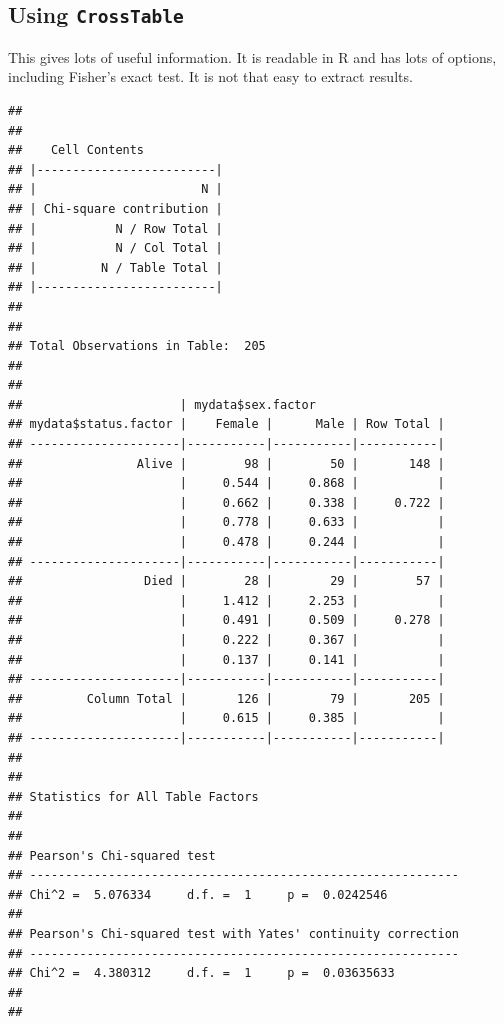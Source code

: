 \documentclass[]{book}
\makeatletter
\newenvironment{Shaded}{\begin{snugshade}}{\end{snugshade}}
\newcommand{\CommentTok}[1]{\textcolor[rgb]{0.56,0.35,0.01}{\textit{#1}}}
\newcommand{\DataTypeTok}[1]{\textcolor[rgb]{0.13,0.29,0.53}{#1}}
\newcommand{\KeywordTok}[1]{\textcolor[rgb]{0.13,0.29,0.53}{\textbf{#1}}}
\newcommand{\NormalTok}[1]{#1}
\newcommand{\OperatorTok}[1]{\textcolor[rgb]{0.81,0.36,0.00}{\textbf{#1}}}
\newcommand{\OtherTok}[1]{\textcolor[rgb]{0.56,0.35,0.01}{#1}}
\newenvironment{kframe}{%
\medskip{}
\setlength{\fboxsep}{.8em}
 \def\at@end@of@kframe{}%
 \ifinner\ifhmode%
  \def\at@end@of@kframe{\end{minipage}}%
  \begin{minipage}{\columnwidth}%
 \fi\fi%
 \def\FrameCommand##1{\hskip\@totalleftmargin \hskip-\fboxsep
 \colorbox{shadecolor}{##1}\hskip-\fboxsep
     \hskip-\linewidth \hskip-\@totalleftmargin \hskip\columnwidth}%
 \MakeFramed {\advance\hsize-\width
   \@totalleftmargin\z@ \linewidth\hsize
   \@setminipage}}%
 {\par\unskip\endMakeFramed%
 \at@end@of@kframe}
\renewenvironment{Shaded}{\begin{kframe}}{\end{kframe}}
\theoremstyle{definition}
\theoremstyle{definition}
\theoremstyle{definition}
\theoremstyle{remark}
\makeatother
\begin{document}
\hypertarget{using-crosstable}{%
\subsection{\texorpdfstring{Using
\texttt{CrossTable}}{Using CrossTable}}\label{using-crosstable}}

This gives lots of useful information. It is readable in R and has lots
of options, including Fisher's exact test. It is not that easy to
extract results. \newpage

\begin{Shaded}
\end{Shaded}

\begin{verbatim}
## 
##  
##    Cell Contents
## |-------------------------|
## |                       N |
## | Chi-square contribution |
## |           N / Row Total |
## |           N / Col Total |
## |         N / Table Total |
## |-------------------------|
## 
##  
## Total Observations in Table:  205 
## 
##  
##                      | mydata$sex.factor 
## mydata$status.factor |    Female |      Male | Row Total | 
## ---------------------|-----------|-----------|-----------|
##                Alive |        98 |        50 |       148 | 
##                      |     0.544 |     0.868 |           | 
##                      |     0.662 |     0.338 |     0.722 | 
##                      |     0.778 |     0.633 |           | 
##                      |     0.478 |     0.244 |           | 
## ---------------------|-----------|-----------|-----------|
##                 Died |        28 |        29 |        57 | 
##                      |     1.412 |     2.253 |           | 
##                      |     0.491 |     0.509 |     0.278 | 
##                      |     0.222 |     0.367 |           | 
##                      |     0.137 |     0.141 |           | 
## ---------------------|-----------|-----------|-----------|
##         Column Total |       126 |        79 |       205 | 
##                      |     0.615 |     0.385 |           | 
## ---------------------|-----------|-----------|-----------|
## 
##  
## Statistics for All Table Factors
## 
## 
## Pearson's Chi-squared test 
## ------------------------------------------------------------
## Chi^2 =  5.076334     d.f. =  1     p =  0.0242546 
## 
## Pearson's Chi-squared test with Yates' continuity correction 
## ------------------------------------------------------------
## Chi^2 =  4.380312     d.f. =  1     p =  0.03635633 
## 
## 
\end{verbatim}
\end{document}
